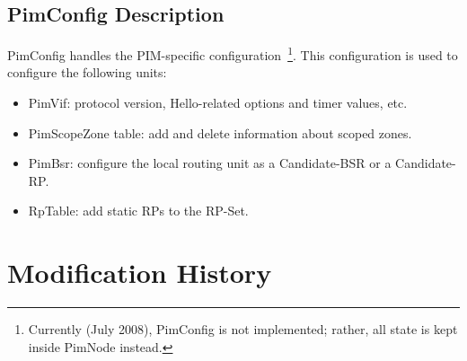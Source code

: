 \documentclass[11pt]{article}
\begin{document}
\subsection{PimConfig Description}

PimConfig handles the PIM-specific configuration~\footnote{Currently
(July 2008), PimConfig is not implemented; rather, all state is
kept inside PimNode instead.}. This configuration is used to configure the
following units:

\begin{itemize}

  \item PimVif: protocol version, Hello-related options and timer
  values, etc.

  \item PimScopeZone table: add and delete information about scoped zones.

  \item PimBsr: configure the local routing unit as a Candidate-BSR or a
  Candidate-RP.

  \item RpTable: add static RPs to the RP-Set.

\end{itemize}

\appendix
\section{Modification History}
\end{document}
